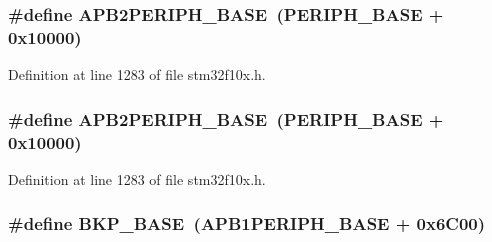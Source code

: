 \subsubsection[{\texorpdfstring{A\+P\+B2\+P\+E\+R\+I\+P\+H\+\_\+\+B\+A\+SE}{APB2PERIPH_BASE}}]{\setlength{\rightskip}{0pt plus 5cm}\#define A\+P\+B2\+P\+E\+R\+I\+P\+H\+\_\+\+B\+A\+SE~({\bf P\+E\+R\+I\+P\+H\+\_\+\+B\+A\+SE} + 0x10000)}\hypertarget{group___peripheral__memory__map_ga25b99d6065f1c8f751e78f43ade652cb}{}\label{group___peripheral__memory__map_ga25b99d6065f1c8f751e78f43ade652cb}


Definition at line 1283 of file stm32f10x.\+h.

\subsubsection[{\texorpdfstring{A\+P\+B2\+P\+E\+R\+I\+P\+H\+\_\+\+B\+A\+SE}{APB2PERIPH_BASE}}]{\setlength{\rightskip}{0pt plus 5cm}\#define A\+P\+B2\+P\+E\+R\+I\+P\+H\+\_\+\+B\+A\+SE~({\bf P\+E\+R\+I\+P\+H\+\_\+\+B\+A\+SE} + 0x10000)}\hypertarget{group___peripheral__memory__map_ga25b99d6065f1c8f751e78f43ade652cb}{}\label{group___peripheral__memory__map_ga25b99d6065f1c8f751e78f43ade652cb}


Definition at line 1283 of file stm32f10x.\+h.

\subsubsection[{\texorpdfstring{B\+K\+P\+\_\+\+B\+A\+SE}{BKP_BASE}}]{\setlength{\rightskip}{0pt plus 5cm}\#define B\+K\+P\+\_\+\+B\+A\+SE~({\bf A\+P\+B1\+P\+E\+R\+I\+P\+H\+\_\+\+B\+A\+SE} + 0x6\+C00)}\hypertarget{group___peripheral__memory__map_gaa15d5a9f40794105397ba5ea567c4ae1}{}\label{group___peripheral__memory__map_gaa15d5a9f40794105397ba5ea567c4ae1}


